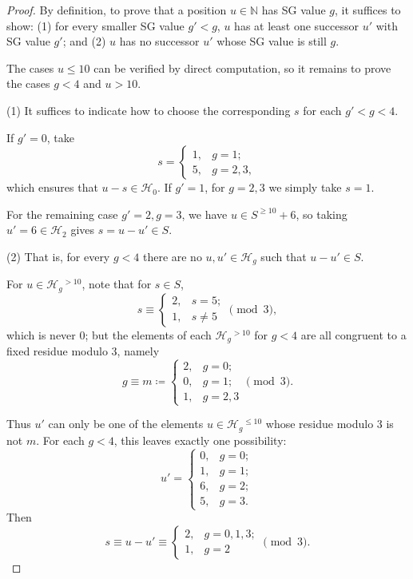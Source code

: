 \documentclass[11pt]{article}
\theoremstyle{definition}
\theoremstyle{plain}
\begin{document}
\begin{proof}
    By definition, to prove that a position $u\in\mathbb{N}$ has SG value $g$, it suffices to show:
    (1) for every smaller SG value $g'<g$, $u$ has at least one successor $u'$ with SG value $g'$; and
    (2) $u$ has no successor $u'$ whose SG value is still $g$.

    The cases $u\leq 10$ can be verified by direct computation, so it remains to prove the cases $g<4$ and $u>10$.

    (1) It suffices to indicate how to choose the corresponding $s$ for each $g'<g<4$.

    If $g'=0$, take
    \[
        s=
        \begin{cases}
            1, & g=1; \\
            5, & g=2,3,
        \end{cases}
    \]
    which ensures that $u-s\in \mathcal{H}_0$.
    If $g'=1$, for $g=2,3$ we simply take $s=1$.

    For the remaining case $g'=2, g=3$, we have $u\in S^{\geq 10}+6$, so taking $u'=6\in\mathcal{H}_2$ gives $s=u-u'\in S$.

    (2) That is, for every $g<4$ there are no $u,u'\in\mathcal{H}_g$ such that $u-u'\in S$.

    For $u\in\mathcal{H}_g{}^{>10}$, note that for $s\in S$,
    \[
        s\equiv
        \begin{cases}
            2, & s=5; \\
            1, & s\neq 5
        \end{cases}
        \pmod 3,
    \]
    which is never $0$; but the elements of each $\mathcal{H}_g{}^{>10}$ for $g<4$ are all congruent to a fixed residue modulo $3$, namely
    \[
        g \equiv m \coloneqq
        \begin{cases}
            2, & g=0; \\
            0, & g=1; \\
            1, & g=2,3
        \end{cases}
        \pmod 3.
    \]

    Thus $u'$ can only be one of the elements $u\in\mathcal{H}_g{}^{\leq 10}$ whose residue modulo $3$ is not $m$.
    For each $g<4$, this leaves exactly one possibility:
    \[
        u'=
        \begin{cases}
            0, & g=0; \\
            1, & g=1; \\
            6, & g=2; \\
            5, & g=3.
        \end{cases}
    \]
    Then
    \[
        s\equiv u-u' \equiv
        \begin{cases}
            2, & g=0,1,3;\\
            1, & g=2
        \end{cases}
        \pmod 3.
    \]


\end{proof}
\end{document}
